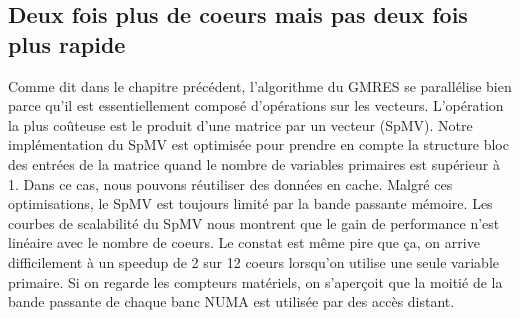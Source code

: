 \subsection{Deux fois plus de coeurs mais pas deux fois plus rapide}
Comme dit dans le chapitre précédent, l'algorithme du GMRES se parallélise bien parce qu'il est essentiellement composé d'opérations sur les vecteurs.
%
L'opération la plus coûteuse est le produit d'une matrice par un vecteur (SpMV).
%
Notre implémentation du SpMV est optimisée pour prendre en compte la structure bloc des entrées de la matrice quand le nombre de variables primaires est supérieur à 1.
%
Dans ce cas, nous pouvons réutiliser des données en cache.
%
Malgré ces optimisations, le SpMV est toujours limité par la bande passante mémoire.
%
Les courbes de scalabilité du SpMV nous montrent que le gain de performance n'est linéaire avec le nombre de coeurs.
%
Le constat est même pire que ça, on arrive difficilement à un speedup de 2 sur 12 coeurs lorsqu'on utilise une seule variable primaire.
%
Si on regarde les compteurs matériels, on s'aperçoit que la moitié de la bande passante de chaque banc NUMA est utilisée par des accès distant.
